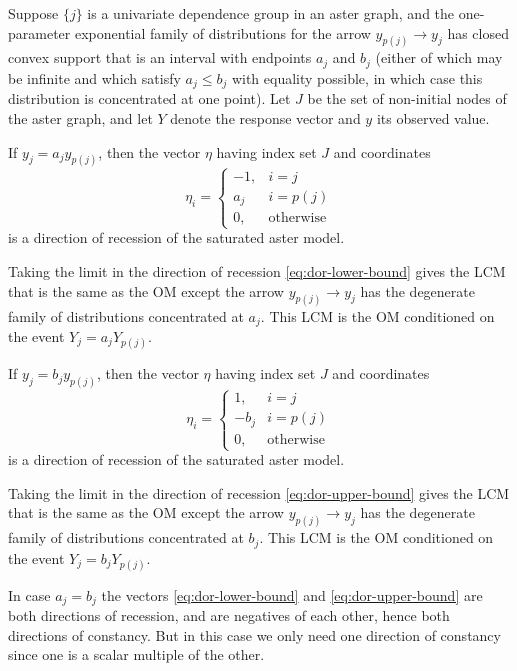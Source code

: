 \begin{theorem} \label{th:dor-arrow}
Suppose $\{j\}$ is a univariate dependence group in an aster graph, and
the one-parameter exponential family of distributions for the arrow
$y_{p(j)} \longrightarrow y_j$ has closed convex support that is an
interval with endpoints $a_j$ and $b_j$ (either of which may be infinite and
which satisfy $a_j \le b_j$ with equality possible, in which case this
distribution is concentrated at one point).  Let $J$
be the set of non-initial nodes of the aster graph,
and let $Y$ denote the response vector and $y$ its observed value.

If $y_j = a_j y_{p(j)}$, then the vector $\eta$ having index set $J$
and coordinates
\begin{equation} \label{eq:dor-lower-bound}
   \eta_i = \begin{cases} -1, & i = j \\ a_j & i = p(j) \\
   0, & \text{otherwise} \end{cases}
\end{equation}
is a direction of recession of the saturated aster model.

Taking the limit in the direction of recession \eqref{eq:dor-lower-bound}
gives the LCM that is the same as the OM except the arrow
$y_{p(j)} \longrightarrow y_j$ has the degenerate family of distributions
concentrated at $a_j$.
This LCM is the OM conditioned on the event $Y_j = a_j Y_{p(j)}$.

If $y_j = b_j y_{p(j)}$, then the vector $\eta$ having index set $J$
and coordinates
\begin{equation} \label{eq:dor-upper-bound}
   \eta_i = \begin{cases} 1, & i = j \\ - b_j & i = p(j) \\
   0, & \text{otherwise} \end{cases}
\end{equation}
is a direction of recession of the saturated aster model.

Taking the limit in the direction of recession \eqref{eq:dor-upper-bound}
gives the LCM that is the same as the OM except the arrow
$y_{p(j)} \longrightarrow y_j$ has the degenerate family of distributions
concentrated at $b_j$.
This LCM is the OM conditioned on the event $Y_j = b_j Y_{p(j)}$.

In case $a_j = b_j$ the vectors \eqref{eq:dor-lower-bound}
and \eqref{eq:dor-upper-bound} are both directions of recession,
and are negatives of each other, hence both directions of constancy.
But in this case we only need one direction of constancy since one
is a scalar multiple of the other.
\end{theorem}
